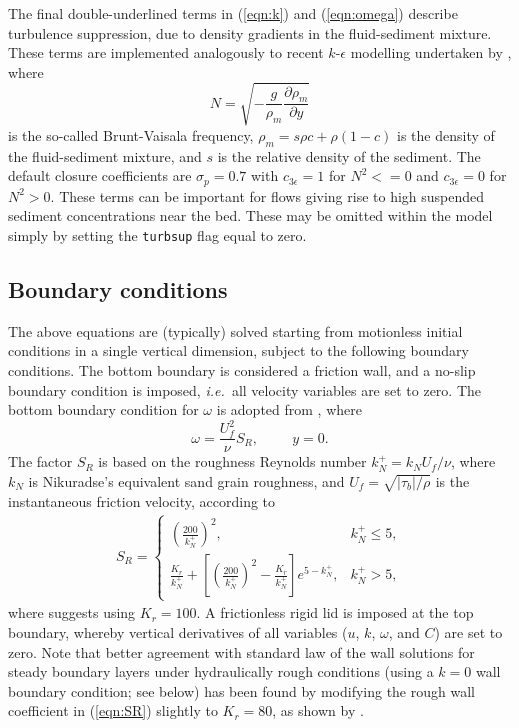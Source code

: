 \documentclass[12pt]{article}
\newcommand{\ie}{{\it i.e.\ }}
\begin{document}
The final double-underlined terms in (\ref{eqn:k}) and
(\ref{eqn:omega}) describe turbulence suppression, due to density
gradients in the fluid-sediment mixture.  These terms are implemented
analogously to recent $k$-$\epsilon$ modelling undertaken by
\cite{Ruessinketal2009}, where
%
\begin{equation}
N = \sqrt{-\frac{g}{\rho_m}\frac{\partial\rho_m}{\partial y}}
\end{equation}
%
is the so-called Brunt-Vaisala frequency, $\rho_m=s\rho c + \rho(1-c)$
is the density of the fluid-sediment mixture, and $s$ is the relative
density of the sediment.  The default closure coefficients are
$\sigma_p=0.7$ with $c_{3\epsilon}=1$ for $N^2<=0$ and
$c_{3\epsilon}=0$ for $N^2>0$.  These terms can be important for flows
giving rise to high suspended sediment concentrations near the bed.
These may be omitted within the model simply by setting the
\texttt{turbsup} flag equal to zero.


\subsection{Boundary conditions}

The above equations are (typically) solved starting from motionless
initial conditions in a single vertical dimension, subject to the
following boundary conditions.  The bottom boundary is considered a
friction wall, and a no-slip boundary condition is imposed, \ie all
velocity variables are set to zero.  The bottom boundary condition for
$\omega$ is adopted from \cite{Wilcox2006}, where
%
\vspace{-10pt}\begin{equation}
\omega = \frac{U_f^2}{\nu} S_R,
\hspace{1cm}
y=0.
\end{equation}
%
\noindent
The factor $S_R$ is based on the roughness Reynolds number $k_N^+=k_N
U_f/\nu$, where $k_N$ is Nikuradse's equivalent sand grain roughness,
and $U_f=\sqrt{\left|\tau_b\right|/\rho}$ is the instantaneous
friction velocity, according to
%
\begin{eqnarray}
S_R = 
\left\{ 
\begin{array}{ll}
\left(\frac{200}{k_N^+}\right)^2, & k_N^+ \leq 5,\\
\frac{K_r}{k_N^+} + \left[\left(\frac{200}{k_N^+}\right)^2 - \frac{K_r}{k_N^+} \right]e^{5-k_N^+}, & k_N^+ > 5,
\end{array} 
\right.
\label{eqn:SR}
\end{eqnarray}
%
where \cite{Wilcox2006} suggests using $K_r=100$.  A frictionless
rigid lid is imposed at the top boundary, whereby vertical derivatives
of all variables ($u$, $k$, $\omega$, and $C$) are set to zero.  Note
that better agreement with standard law of the wall solutions for
steady boundary layers under hydraulically rough conditions (using a
$k=0$ wall boundary condition; see below) has been found by modifying
the rough wall coefficient in (\ref{eqn:SR}) slightly to $K_r=80$, as
shown by \cite{Fuhrmanetal2010}.
\end{document}
